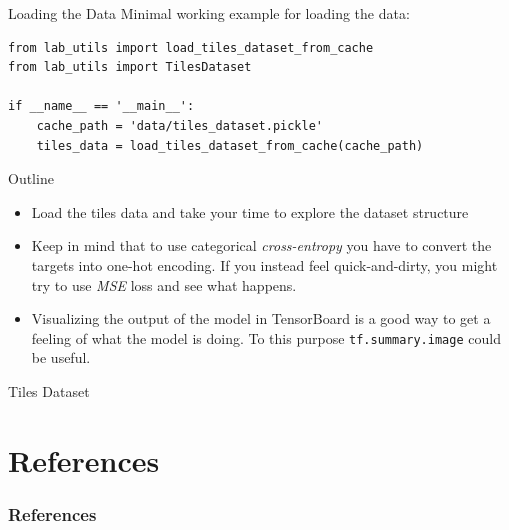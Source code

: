 \documentclass[aspectratio=169]{beamer}
\begin{document}

\begin{frame}[fragile]{Loading the Data}
Minimal working example for loading the data:
\begin{verbatim}
from lab_utils import load_tiles_dataset_from_cache
from lab_utils import TilesDataset

if __name__ == '__main__':
    cache_path = 'data/tiles_dataset.pickle'
    tiles_data = load_tiles_dataset_from_cache(cache_path)
\end{verbatim}
\end{frame}


\begin{frame}{Outline}
\begin{itemize}
\item Load the tiles data and take your time to explore the dataset structure
\item Keep in mind that to use categorical \textit{cross-entropy} you have to convert the targets into one-hot encoding. If you instead feel quick-and-dirty, you might try to use \textit{MSE} loss and see what happens.
\item Visualizing the output of the model in TensorBoard is a good way to get a feeling of what the model is doing. To this purpose \texttt{tf.summary.image} could be useful.
\end{itemize}
\end{frame}


\begin{frame}{Tiles Dataset}
\end{frame}



\section{References}

\begin{frame}[t, allowframebreaks]
\frametitle{References}


\end{frame}
\end{document}
